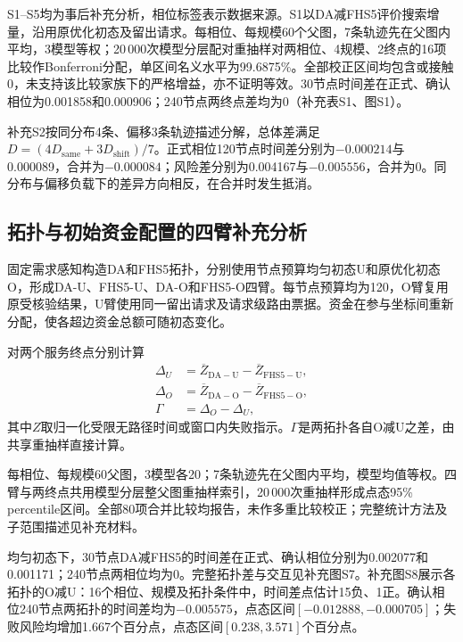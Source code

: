 \documentclass[UTF8,a4paper,twocolumn,fontset=none,zihao=5]{ctexart}
\begin{document}
S1–S5均为事后补充分析，相位标签表示数据来源。S1以DA减FHS5评价搜索增量，沿用原优化初态及留出请求。每相位、每规模60个父图，7条轨迹先在父图内平均，3模型等权；20\,000次模型分层配对重抽样对两相位、4规模、2终点的16项比较作Bonferroni分配，单区间名义水平为99.6875\%。全部校正区间均包含或接触0，未支持该比较家族下的严格增益，亦不证明等效。30节点时间差在正式、确认相位为0.001858和0.000906；240节点两终点差均为0（补充表S1、图S1）。

补充S2按同分布4条、偏移3条轨迹描述分解，总体差满足$D=(4D_{\mathrm{same}}+3D_{\mathrm{shift}})/7$。正式相位120节点时间差分别为$-0.000214$与0.000089，合并为$-0.000084$；风险差分别为0.004167与$-0.005556$，合并为0。同分布与偏移负载下的差异方向相反，在合并时发生抵消。


\subsection{拓扑与初始资金配置的四臂补充分析}

固定需求感知构造DA和FHS5拓扑，分别使用节点预算均匀初态U和原优化初态O，形成DA-U、FHS5-U、DA-O和FHS5-O四臂。每节点预算均为120，O臂复用原受核验结果，U臂使用同一留出请求及请求级路由票据。资金在参与坐标间重新分配，使各超边资金总额可随初态变化。

对两个服务终点分别计算
\begin{equation}
\begin{aligned}
\Delta_U&=\overline Z_{\mathrm{DA-U}}-\overline Z_{\mathrm{FHS5-U}},\\
\Delta_O&=\overline Z_{\mathrm{DA-O}}-\overline Z_{\mathrm{FHS5-O}},\\
\Gamma&=\Delta_O-\Delta_U,
\end{aligned}\label{eq:s5-interaction}
\end{equation}
其中$Z$取归一化受限无路径时间或窗口内失败指示。$\Gamma$是两拓扑各自O减U之差，由共享重抽样直接计算。

每相位、每规模60父图，3模型各20；7条轨迹先在父图内平均，模型均值等权。四臂与两终点共用模型分层整父图重抽样索引，20\,000次重抽样形成点态95\% percentile区间。全部80项合并比较均报告，未作多重比较校正；完整统计方法及子范围描述见补充材料。

均匀初态下，30节点DA减FHS5的时间差在正式、确认相位分别为0.002077和0.001171；240节点两相位均为0。完整拓扑差与交互见补充图S7。补充图S8展示各拓扑的O减U：16个相位、规模及拓扑条件中，时间差点估计15负、1正。确认相位240节点两拓扑的时间差均为$-0.005575$，点态区间$[-0.012888,-0.000705]$；失败风险均增加1.667个百分点，点态区间$[0.238,3.571]$个百分点。
\end{document}
